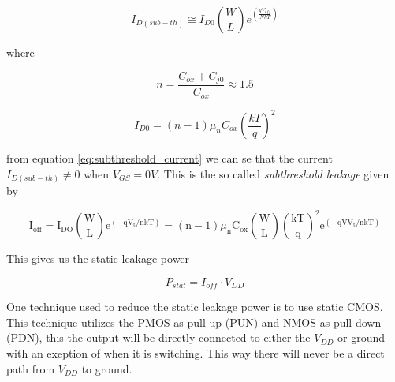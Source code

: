 \begin{equation}
    I_{D(sub-th)}\cong I_{D0} \left(\frac{W}{L}\right) e^{(\frac{qV_{eff}}{NkT})}
    \label{eq:subthreshold_current}
\end{equation}

where

\begin{equation}
    n=\frac{C_{ox}+C_{j0}}{C_{ox}}\approx 1.5
    \label{eq:n}
\end{equation}

\begin{equation}
    I_{D0}=(n-1)\mu_nC_{ox}\left(\frac{kT}{q}\right)^2
\end{equation}

from equation \ref{eq:subthreshold_current} we can se that the current $I_{D(sub-th)}\neq 0$ when $V_{GS}=0V$. This is the so called \textit{subthreshold leakage} given by 

\begin{equation}
    \mathrm{I}_{\mathrm{off}}=\mathrm{I}_{\mathrm{DO}}\left(\frac{\mathrm{W}}{\mathrm{L}}\right) \mathrm{e}^{\left(-\mathrm{q} \mathrm{V}_{\mathrm{t}} / \mathrm{nkT}\right)}=(\mathrm{n}-1) \mu_{\mathrm{n}} \mathrm{C}_{\mathrm{ox}}\left(\frac{\mathrm{W}}{\mathrm{L}}\right)\left(\frac{\mathrm{kT}}{\mathrm{q}}\right)^2 \mathrm{e}^{\left(-\mathrm{qV} \mathrm{V}_{\mathrm{t}} / \mathrm{nkT}\right)}
    \label{eq:subthreshold_leakage}
\end{equation}

This gives us the static leakage power \cite{departmentofelectronicsystemsntnu_2023_dc}

\begin{equation}
    P_{stat}=I_{off}\cdot V_{DD}
\end{equation}

One technique used to reduce the static leakage power is to use static CMOS. This technique utilizes the PMOS as pull-up (PUN) and NMOS as pull-down (PDN), this the output will be directly connected to either the $V_{DD}$ or ground with an exeption of when it is switching. This way there will never be a direct path from $V_{DD}$ to ground. \cite{a2018}

